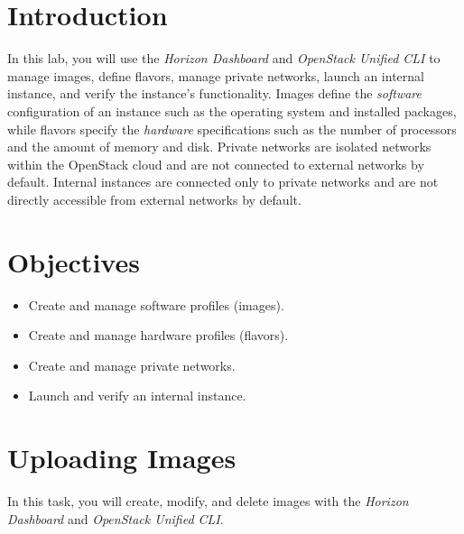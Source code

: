 \documentclass[letterpaper, 12pt]{article}
\begin{document}

\section*{Introduction}\label{sec:introduction}
In this lab, you will use the \textit{Horizon Dashboard} and \textit{OpenStack Unified CLI} to manage images, define flavors, manage private networks, launch an internal instance, and verify the instance's functionality.
Images define the \textit{software} configuration of an instance such as the operating system and installed packages, while flavors specify the \textit{hardware} specifications such as the number of processors and the amount of memory and disk.
Private networks are isolated networks within the OpenStack cloud and are not connected to external networks by default.
Internal instances are connected only to private networks and are not directly accessible from external networks by default.

\section*{Objectives}\label{sec:objectives}
\begin{itemize}[itemsep=0pt]
    \item Create and manage software profiles (images).
    \item Create and manage hardware profiles (flavors).
    \item Create and manage private networks.
    \item Launch and verify an internal instance.
\end{itemize}

\labsettings

\section{Uploading Images}\label{sec:uploading-images}
In this task, you will create, modify, and delete images with the \textit{Horizon Dashboard} and \textit{OpenStack Unified CLI}.
\end{document}
